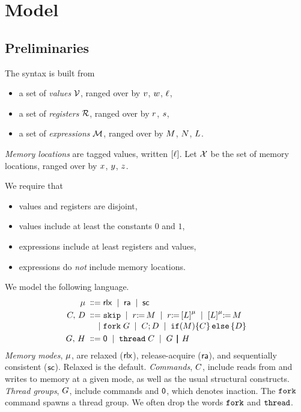 \section{Model}

\subsection{Preliminaries}
The syntax is built from
\begin{itemize}
\item a set of \emph{values} $\mathcal{V}$, ranged over by
  $v$, $w$, $\ell$,
\item a set of \emph{registers} $\mathcal{R}$, ranged over by
  $r$, $s$,
\item a set of \emph{expressions} $\mathcal{M}$, ranged over by
  $M$, $N$,  $L$.
\end{itemize}
\emph{Memory locations} are tagged values, written $\mathtt{[}\ell\mathtt{]}$.  Let $\mathcal{X}$
be the set of memory locations, ranged over by $x$, $y$, $z$.

We require that
\begin{itemize}
\item values and registers are disjoint,
\item values include at least the constants $0$ and $1$,
\item expressions include at least registers and values, 
\item expressions do \emph{not} include memory locations.
\end{itemize}
We model the following language.
\begin{align*}
  \amode \BNFDEF& \mRLX
  \BNFSEP \mRA 
  \BNFSEP \mSC
  \\
  \aCmd,\,\bCmd
  \BNFDEF& \SKIP
  \BNFSEP \LET{\aReg}{\aExp}
  \BNFSEP \PRREF[\amode]{\cExp}{\aReg}
  \BNFSEP \PWREF[\amode]{\cExp}{\aExp}
  \\[-.5ex]
  \BNFSEP& \FORK{\aGrp}
  \BNFSEP \aCmd \SEMI \bCmd
  \BNFSEP \IF{\aExp} \THEN \aCmd \ELSE \bCmd \FI
  \\
  \aGrp ,\,\bGrp
  \BNFDEF& \NIL
  \BNFSEP\THREAD{\aCmd}
  \BNFSEP\aGrp \PAR \bGrp
\end{align*}
\emph{Memory modes}, $\mu$, are {relaxed} (${\mathsf{rlx}}$), {release-acquire}
(${\mathsf{ra}}$), and {sequentially consistent} (${\mathsf{sc}}$).  Relaxed is the default.
%
\emph{Commands}, $C$, include reads from and writes to memory at a given
mode, as well as the usual structural constructs.
%
\emph{Thread groups}, $G$, include commands and $\mathsf{0}$, which denotes
inaction. %
%
The $\FORK{}$ command spawns a thread group.  We often drop the words
$\FORK{}$ and $\THREAD{}$.

